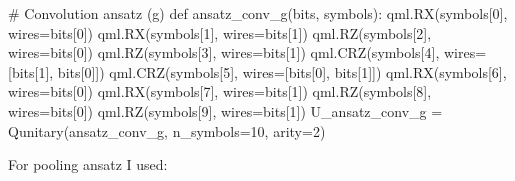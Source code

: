 \documentclass[
  13pt,
  a4paper,
  DIV=11,
  numbers=noendperiod,
  oneside]{scrreprt}
\newenvironment{Shaded}{\begin{snugshade}}{\end{snugshade}}
\newcommand{\CommentTok}[1]{\textcolor[rgb]{0.37,0.37,0.37}{#1}}
\newcommand{\DecValTok}[1]{\textcolor[rgb]{0.68,0.00,0.00}{#1}}
\newcommand{\KeywordTok}[1]{\textcolor[rgb]{0.00,0.23,0.31}{#1}}
\newcommand{\NormalTok}[1]{\textcolor[rgb]{0.00,0.23,0.31}{#1}}
\newcommand{\OperatorTok}[1]{\textcolor[rgb]{0.37,0.37,0.37}{#1}}
\begin{document}
\begin{Shaded}
\begin{Highlighting}[]
\CommentTok{\# Convolution ansatz (g) }
\KeywordTok{def}\NormalTok{ ansatz\_conv\_g(bits, symbols):}
\NormalTok{    qml.RX(symbols[}\DecValTok{0}\NormalTok{], wires}\OperatorTok{=}\NormalTok{bits[}\DecValTok{0}\NormalTok{])}
\NormalTok{    qml.RX(symbols[}\DecValTok{1}\NormalTok{], wires}\OperatorTok{=}\NormalTok{bits[}\DecValTok{1}\NormalTok{])}
\NormalTok{    qml.RZ(symbols[}\DecValTok{2}\NormalTok{], wires}\OperatorTok{=}\NormalTok{bits[}\DecValTok{0}\NormalTok{])}
\NormalTok{    qml.RZ(symbols[}\DecValTok{3}\NormalTok{], wires}\OperatorTok{=}\NormalTok{bits[}\DecValTok{1}\NormalTok{])}
\NormalTok{    qml.CRZ(symbols[}\DecValTok{4}\NormalTok{], wires}\OperatorTok{=}\NormalTok{[bits[}\DecValTok{1}\NormalTok{], bits[}\DecValTok{0}\NormalTok{]])}
\NormalTok{    qml.CRZ(symbols[}\DecValTok{5}\NormalTok{], wires}\OperatorTok{=}\NormalTok{[bits[}\DecValTok{0}\NormalTok{], bits[}\DecValTok{1}\NormalTok{]])}
\NormalTok{    qml.RX(symbols[}\DecValTok{6}\NormalTok{], wires}\OperatorTok{=}\NormalTok{bits[}\DecValTok{0}\NormalTok{])}
\NormalTok{    qml.RX(symbols[}\DecValTok{7}\NormalTok{], wires}\OperatorTok{=}\NormalTok{bits[}\DecValTok{1}\NormalTok{])}
\NormalTok{    qml.RZ(symbols[}\DecValTok{8}\NormalTok{], wires}\OperatorTok{=}\NormalTok{bits[}\DecValTok{0}\NormalTok{])}
\NormalTok{    qml.RZ(symbols[}\DecValTok{9}\NormalTok{], wires}\OperatorTok{=}\NormalTok{bits[}\DecValTok{1}\NormalTok{])}
\NormalTok{U\_ansatz\_conv\_g }\OperatorTok{=}\NormalTok{ Qunitary(ansatz\_conv\_g, n\_symbols}\OperatorTok{=}\DecValTok{10}\NormalTok{, arity}\OperatorTok{=}\DecValTok{2}\NormalTok{)}
\end{Highlighting}
\end{Shaded}

For pooling ansatz I used:
\end{document}
